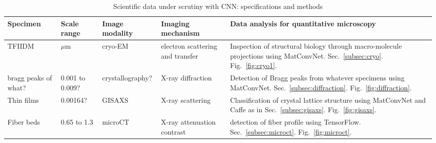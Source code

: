 
\begin{table*}[!]
\centering
\caption{Scientific data under scrutiny with CNN: specifications and methods}
\label{table1}
\begin{tabular}{p{2cm}p{1.6cm}p{1.6cm}p{3cm}p{7.5cm}}
\hline
\rowcolor[HTML]{CCE5FF}
Specimen  &  Scale range  &  Image \newline modality  &  Imaging  \newline mechanism  &  Data analysis for quantitative microscopy
\\
\hline
\rowcolor[HTML]{FFFFFF} %
TFIIDM & $\mu$m & cryo-EM & electron scattering and transfer & Inspection of structural biology through macro-molecule projections using MatConvNet. Sec.~\ref{subsec:cryo}. Fig.~\ref{fig:cryo1}.
\\
\hline
\rowcolor[HTML]{F6F6F4} %
bragg peaks of what? & 0.001 to 0.009?  & crystallography? & X-ray diffraction  & Detection of Bragg peaks from whatever specimens using MatConvNet. Sec.~\ref{subsec:diffraction}. Fig.~\ref{fig:diffraction}.
\\
\hline
\rowcolor[HTML]{FFFFFF} %
Thin films   & 0.00164?  & GISAXS  & X-ray scattering & Classification of crystal lattice structure using MatConvNet and Caffe as in Sec.~\ref{subsec:gisaxs}. Fig.~\ref{fig:gisaxs}.
\\
\hline
\rowcolor[HTML]{F6F6F4} %
Fiber beds & 0.65 to 1.3 & microCT  & X-ray attenuation contrast & detection of fiber profile using TensorFlow. Sec.~\ref{subsec:microct}. Fig.~\ref{fig:microct}.
\\
\hline
\end{tabular}
\end{table*}
